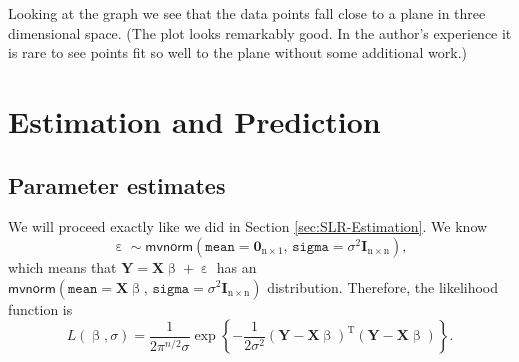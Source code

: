 \documentclass[captions=tableheading]{scrbook}
\begin{document}
Looking at the graph we see that the data points fall close to a plane in three dimensional space. (The plot looks remarkably good. In the author's experience it is rare to see points fit so well to the plane without some additional work.)
\section{Estimation and Prediction}
\label{sec-1-2}

\label{sec:Estimation-and-Prediction-MLR}
\subsection{Parameter estimates}
\label{sec-1-2-1}

\label{sub:mlr-parameter-estimates}

We will proceed exactly like we did in Section \ref{sec:SLR-Estimation}. We know
\begin{equation}
\upepsilon\sim\mathsf{mvnorm}\left(\mathtt{mean}=\mathbf{0}_{\mathrm{n}\times1},\,\mathtt{sigma}=\sigma^{2}\mathbf{I}_{\mathrm{n}\times\mathrm{n}}\right),
\end{equation}
which means that $\mathbf{Y}=\mathbf{X}\upbeta+\upepsilon$ has an $\mathsf{mvnorm}\left(\mathtt{mean}=\mathbf{X}\upbeta,\,\mathtt{sigma}=\sigma^{2}\mathbf{I}_{\mathrm{n}\times\mathrm{n}}\right)$ distribution. Therefore, the likelihood function is
\begin{equation}
L(\upbeta,\sigma)=\frac{1}{2\pi^{n/2}\sigma}\exp\left\{ -\frac{1}{2\sigma^{2}}\left(\mathbf{Y}-\mathbf{X}\upbeta\right)^{\mathrm{T}}\left(\mathbf{Y}-\mathbf{X}\upbeta\right)\right\}.
\end{equation}
\end{document}
